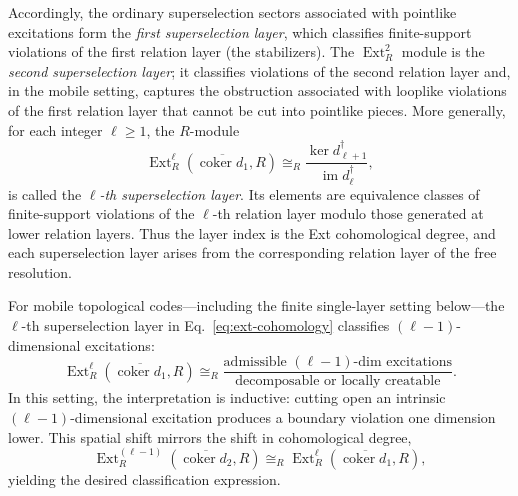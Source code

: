 \documentclass[aps,prx,english,superscriptaddress,twocolumn,tightenlines,showpacs,longbibliography,floatfix,amsfonts]{revtex4-2}
\theoremstyle{remark}
\theoremstyle{definition}
\begin{document}
Accordingly, the ordinary superselection sectors associated with pointlike
excitations form the \emph{first superselection layer}, which
classifies finite-support violations of the first relation layer (the
stabilizers). The
$\operatorname{Ext}_R^2$ module is the \emph{second superselection layer};
it classifies violations of the second relation layer and, in the mobile
setting, captures the obstruction associated with looplike violations of the
first relation layer that cannot be cut into pointlike pieces. More
generally, for each integer $\ell\geq1$, the \(R\)-module
\begin{equation}
	\operatorname{Ext}_R^\ell(\overline{\operatorname{coker}d_1}, R) \cong_R \frac{\ker d_{\ell+1}^\dagger}{\operatorname{im} d_\ell^\dagger} ,
	\label{eq:ext-cohomology}
\end{equation}
is called the \emph{\(\ell\)-th superselection layer}. Its elements are
equivalence classes of finite-support violations of the $\ell$-th relation
layer modulo those generated at lower relation layers. Thus the layer index is
the Ext cohomological degree, and each superselection layer arises from the
corresponding relation layer of the free resolution.

For mobile topological codes---including the finite single-layer setting
below---the \(\ell\)-th superselection layer in
Eq.~\eqref{eq:ext-cohomology} classifies $(\ell-1)$-dimensional excitations:
\begin{equation}
		\operatorname{Ext}_R^\ell(\overline{\operatorname{coker}d_1}, R) \cong_R \frac{\text{admissible $(\ell-1)$-dim excitations}}{\text{decomposable or locally creatable}}. \label{eq:Ext_classication}
\end{equation}
In this setting, the interpretation is inductive: cutting open an intrinsic $(\ell-1)$-dimensional excitation produces a boundary violation one dimension lower. This spatial shift mirrors the shift in cohomological degree,
\begin{equation}
		\operatorname{Ext}_R^{(\ell-1)}(\overline{\operatorname{coker}d_2}, R) \cong_R \operatorname{Ext}_R^\ell(\overline{\operatorname{coker}d_1}, R),
\end{equation}
yielding the desired classification expression.
\end{document}
